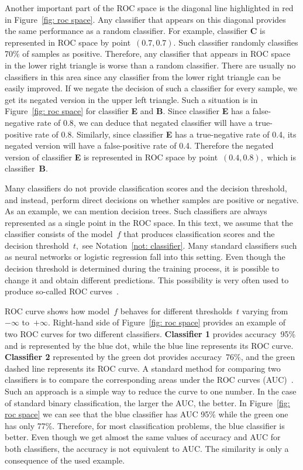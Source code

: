 Another important part of the ROC space is the diagonal line highlighted in red in Figure~\ref{fig: roc space}. Any classifier that appears on this diagonal provides the same performance as a random classifier. For example, classifier \textbf{C} is represented in ROC space by point~$(0.7, 0.7).$ Such classifier randomly classifies 70\% of samples as positive. Therefore, any classifier that appears in ROC space in the lower right triangle is worse than a random classifier. There are usually no classifiers in this area since any classifier from the lower right triangle can be easily improved. If we negate the decision of such a classifier for every sample, we get its negated version in the upper left triangle. Such a situation is in Figure~\ref{fig: roc space} for classifier \textbf{E} and \textbf{B}. Since classifier \textbf{E} has a false-negative rate of 0.8, we can deduce that negated classifier will have a true-positive rate of 0.8. Similarly, since classifier \textbf{E} has a true-negative rate of 0.4, its negated version will have a false-positive rate of 0.4. Therefore the negated version of classifier \textbf{E} is represented in ROC space by point~$(0.4, 0.8),$ which is classifier~\textbf{B}.

Many classifiers do not provide classification scores and the decision threshold, and instead, perform direct decisions on whether samples are positive or negative. As an example, we can mention decision trees. Such classifiers are always represented as a single point in the ROC space. In this text, we assume that the classifier consists of the model~$f$ that produces classification scores and the decision threshold~$t,$ see Notation~\ref{not: classifier}. Many standard classifiers such as neural networks or logistic regression fall into this setting. Even though the decision threshold is determined during the training process, it is possible to change it and obtain different predictions. This possibility is very often used to produce so-called ROC curves~\cite{fawcett2006introduction}.

ROC curve shows how model~$f$ behaves for different thresholds~$t$ varying from~$-\infty$ to~$+\infty.$ Right-hand side of Figure~\ref{fig: roc space} provides an example of two ROC curves for two different classifiers. \textbf{Classifier 1} provides accuracy~95\% and is represented by the blue dot, while the blue line represents its ROC curve. \textbf{Classifier 2} represented by the green dot provides accuracy~76\%, and the green dashed line represents its ROC curve. A standard method for comparing two classifiers is to compare the corresponding areas under the ROC curves (AUC)~\cite{bradley1997use, hanley1982meaning}. Such an approach is a simple way to reduce the curve to one number. In the case of standard binary classification, the larger the AUC, the better. In Figure~\ref{fig: roc space} we can see that the blue classifier has AUC 95\% while the green one has only 77\%. Therefore, for most classification problems, the blue classifier is better. Even though we get almost the same values of accuracy and AUC for both classifiers, the accuracy is not equivalent to AUC. The similarity is only a consequence of the used example.

